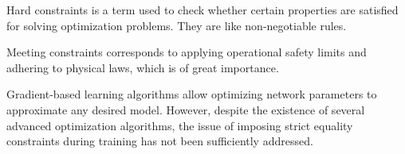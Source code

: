 \begin{comment}
    
Hard constraints é um termo utilizado para verificar se certas propriedades são satisfeitas para resolução de problemas de otimização.\cite{rfc16} São como regras não negociáveis.

A satisfação das restrições corresponde à aplicação dos limites de segurança operacional e à adesão às leis físicas, sendo de suma importância\cite{rfc15}.

Algoritmos de aprendizado baseados em gradiente permitem otimizar os parâmetros de redes para aproximar qualquer modelo desejado. No entanto, apesar da existência de vários algoritmos avançados de otimização, a questão de impor restrições estritas de igualdade durante o treinamento não foi suficientemente abordada\cite{rfc10}.

Aplicar solucionadores tradicionais para otimização geral restrita, como SQP\cite{rfc18}, a redes neurais pode ser não trivial. Como os métodos tradicionais expressam restrições como uma função de parâmetros aprendíveis, essa formulação se torna extremamente dimensional, não linear e não convexa no contexto de redes neurais\cite{rfc10}.

Em operações de sistemas de abastecimento de água é restringida por requisitos mínimos de pressão; limitações de capacidade impostas por bombas, dutos e tanques; e um conjunto de restriçõies hidráulicas. As restrições hidráulicas que dão origem a complexas formulações mistas inteiras e não lineares. A primeira classe de métodos impõe restrições de pressão e capacidade explicitamente, enquanto as restrições hidráulicas são inlcuídas implicitamente por meio de ferramentas de simulação de rede de água, como o EPANET. \cite{rfc17}

\end{comment}

Hard constraints is a term used to check whether certain properties are satisfied for solving optimization problems.\cite{rfc16} They are like non-negotiable rules.

Meeting constraints corresponds to applying operational safety limits and adhering to physical laws, which is of great importance.\cite{rfc15}

Gradient-based learning algorithms allow optimizing network parameters to approximate any desired model. However, despite the existence of several advanced optimization algorithms, the issue of imposing strict equality constraints during training has not been sufficiently addressed.\cite{rfc10}

